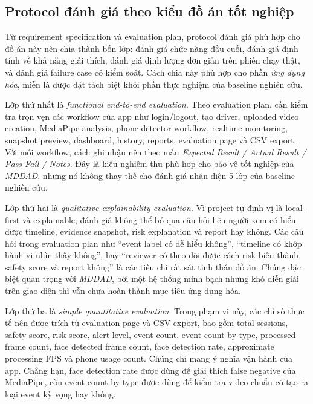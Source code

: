 \documentclass[conference,a4paper]{IEEEtran}
\begin{document}
\subsection{Protocol đánh giá theo kiểu đồ án tốt nghiệp}
Từ requirement specification và evaluation plan, protocol đánh giá phù hợp cho đồ án này nên chia thành bốn lớp: đánh giá chức năng đầu-cuối, đánh giá định tính về khả năng giải thích, đánh giá định lượng đơn giản trên phiên chạy thật, và đánh giá failure case có kiểm soát. Cách chia này phù hợp cho phần \textit{ứng dụng hóa}, miễn là được đặt tách biệt khỏi phần thực nghiệm của baseline nghiên cứu.

Lớp thứ nhất là \textit{functional end-to-end evaluation}. Theo evaluation plan, cần kiểm tra trọn vẹn các workflow của app như login/logout, tạo driver, uploaded video creation, MediaPipe analysis, phone-detector workflow, realtime monitoring, snapshot preview, dashboard, history, reports, evaluation page và CSV export. Với mỗi workflow, cách ghi nhận nên theo mẫu \textit{Expected Result / Actual Result / Pass-Fail / Notes}. Đây là kiểu nghiệm thu phù hợp cho bảo vệ tốt nghiệp của \textit{MDDAD}, nhưng nó không thay thế cho đánh giá nhận diện 5 lớp của baseline nghiên cứu.

Lớp thứ hai là \textit{qualitative explainability evaluation}. Vì project tự định vị là local-first và explainable, đánh giá không thể bỏ qua câu hỏi liệu người xem có hiểu được timeline, evidence snapshot, risk explanation và report hay không. Các câu hỏi trong evaluation plan như ``event label có dễ hiểu không'', ``timeline có khớp hành vi nhìn thấy không'', hay ``reviewer có theo dõi được cách risk biến thành safety score và report không'' là các tiêu chí rất sát tinh thần đồ án. Chúng đặc biệt quan trọng với \textit{MDDAD}, bởi một hệ thống minh bạch nhưng khó diễn giải trên giao diện thì vẫn chưa hoàn thành mục tiêu ứng dụng hóa.

Lớp thứ ba là \textit{simple quantitative evaluation}. Trong phạm vi này, các chỉ số thực tế nên được trích từ evaluation page và CSV export, bao gồm total sessions, safety score, risk score, alert level, event count, event count by type, processed frame count, face detected frame count, face detection rate, approximate processing FPS và phone usage count. Chúng chỉ mang ý nghĩa vận hành của app. Chẳng hạn, face detection rate được dùng để giải thích false negative của MediaPipe, còn event count by type được dùng để kiểm tra video chuẩn có tạo ra loại event kỳ vọng hay không.
\end{document}
